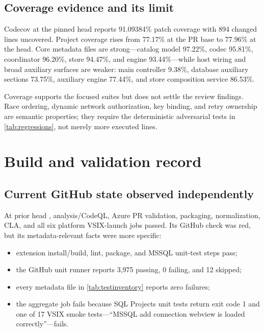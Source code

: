 \documentclass[11pt]{article}
\newcommand{\code}[1]{\texttt{\detokenize{#1}}}
\begin{document}
\subsection{Coverage evidence and its limit}

Codecov at the pinned head reports 91.09384\% patch coverage with 894 changed lines uncovered. Project coverage rises from 77.17\% at the PR base to 77.96\% at the head. Core metadata files are strong---catalog model 97.22\%, codec 95.81\%, coordinator 96.20\%, store 94.47\%, and engine 93.44\%---while host wiring and broad auxiliary surfaces are weaker: main controller 9.38\%, database auxiliary sections 73.75\%, auxiliary engine 77.44\%, and store composition service 86.53\%.

Coverage supports the focused suites but does not settle the review findings. Race ordering, dynamic network authorization, key binding, and retry ownership are semantic properties; they require the deterministic adversarial tests in \cref{tab:regressions}, not merely more executed lines.

\section{Build and validation record}

\subsection{Current GitHub state observed independently}

At prior head \code{9955ff9e6}, analysis/CodeQL, Azure PR validation, packaging, normalization, CLA, and all six platform VSIX-launch jobs passed. Its GitHub \code{build-and-test} check was red, but its metadata-relevant facts were more specific:

\begin{itemize}
  \item extension install/build, lint, package, and MSSQL unit-test steps pass;
  \item the GitHub unit runner reports 3,975 passing, 0 failing, and 12 skipped;
  \item every metadata file in \cref{tab:testinventory} reports zero failures;
  \item the aggregate job fails because SQL Projects unit tests return exit code 1 and one of 17 VSIX smoke tests---``MSSQL add connection webview is loaded correctly''---fails.
\end{itemize}
\end{document}
